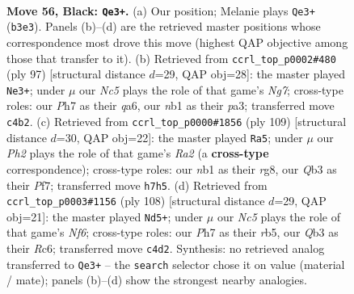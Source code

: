 \documentclass[11pt]{article}
\begin{document}
\clearpage

\begin{figure}[p]\centering
\begin{subfigure}{0.46\textwidth}\centering
\resizebox{\linewidth}{!}{%
\newchessgame
\chessboard[
  setfen={8/2k4p/8/p4r2/2nK4/1q6/4P3/1N6 b - - 0 56},
  showmover=false,
  pgfstyle=straightmove, color=movearrow, markmove={b3-e3}
]}
\caption{}
\end{subfigure}\hfill
\begin{subfigure}{0.46\textwidth}\centering
\resizebox{\linewidth}{!}{%
\newchessgame
\chessboard[
  setfen={5k2/8/Q6p/8/5p2/P4N1P/1q4n1/5K2 b - - 5 49},
  showmover=false,
  pgfstyle=straightmove, color=movearrow, markmove={g2-e3}
]}
\caption{}
\end{subfigure}
\\[4pt]
\begin{subfigure}{0.46\textwidth}\centering
\resizebox{\linewidth}{!}{%
\newchessgame
\chessboard[
  setfen={6R1/r4p2/3p4/3P1k2/1R2n3/3K4/8/8 b - - 12 55},
  showmover=false,
  pgfstyle=straightmove, color=movearrow, markmove={a7-a5}
]}
\caption{}
\end{subfigure}\hfill
\begin{subfigure}{0.46\textwidth}\centering
\resizebox{\linewidth}{!}{%
\newchessgame
\chessboard[
  setfen={2b5/2P1k3/2R2N1p/1r6/8/6K1/8/8 w - - 11 55},
  showmover=false,
  pgfstyle=straightmove, color=movearrow, markmove={f6-d5}
]}
\caption{}
\end{subfigure}
\caption{\textbf{Move 56, Black: \texttt{Qe3+}.} (a) Our position; Melanie plays \texttt{Qe3+} (\texttt{b3e3}). Panels (b)--(d) are the retrieved master positions whose correspondence most drove this move (highest QAP objective among those that transfer to it). (b) Retrieved from \texttt{ccrl\_top\_p0002\#480} (ply 97) [structural distance $d$=29, QAP obj=28]: the master played \texttt{Ne3+}; under $\mu$ our \emph{Nc5} plays the role of that game's \emph{Ng7}; cross-type roles: our \emph{P}h7 as their \emph{q}a6, our \emph{n}b1 as their \emph{p}a3; transferred move \texttt{c4b2}. (c) Retrieved from \texttt{ccrl\_top\_p0000\#1856} (ply 109) [structural distance $d$=30, QAP obj=22]: the master played \texttt{Ra5}; under $\mu$ our \emph{Ph2} plays the role of that game's \emph{Ra2} (a \textbf{cross-type} correspondence); cross-type roles: our \emph{n}b1 as their \emph{r}g8, our \emph{Q}b3 as their \emph{P}f7; transferred move \texttt{h7h5}. (d) Retrieved from \texttt{ccrl\_top\_p0003\#1156} (ply 108) [structural distance $d$=29, QAP obj=21]: the master played \texttt{Nd5+}; under $\mu$ our \emph{Nc5} plays the role of that game's \emph{Nf6}; cross-type roles: our \emph{P}h7 as their \emph{r}b5, our \emph{Q}b3 as their \emph{R}c6; transferred move \texttt{c4d2}. Synthesis: no retrieved analog transferred to \texttt{Qe3+} -- the \texttt{search} selector chose it on value (material / mate); panels (b)--(d) show the strongest nearby analogies.}
\label{fig:thought-m111}
\end{figure}
\end{document}
